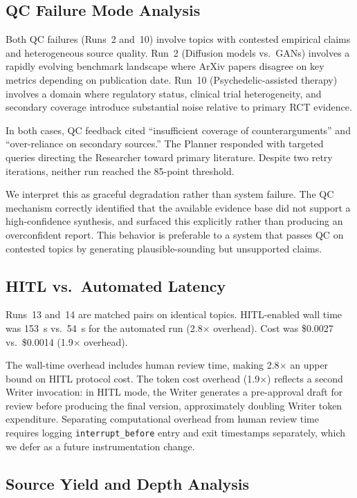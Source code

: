 \documentclass[11pt]{article}
\begin{document}
\subsection{QC Failure Mode Analysis}

Both QC failures (Runs~2 and~10) involve topics with contested empirical claims
and heterogeneous source quality. Run~2 (Diffusion models vs.\ GANs) involves a
rapidly evolving benchmark landscape where ArXiv papers disagree on key metrics
depending on publication date. Run~10 (Psychedelic-assisted therapy) involves a
domain where regulatory status, clinical trial heterogeneity, and secondary
coverage introduce substantial noise relative to primary RCT evidence.

In both cases, QC feedback cited ``insufficient coverage of counterarguments''
and ``over-reliance on secondary sources.'' The Planner responded with targeted
queries directing the Researcher toward primary literature. Despite two retry
iterations, neither run reached the 85-point threshold.

We interpret this as graceful degradation rather than system failure. The QC
mechanism correctly identified that the available evidence base did not support a
high-confidence synthesis, and surfaced this explicitly rather than producing an
overconfident report. This behavior is preferable to a system that passes QC on
contested topics by generating plausible-sounding but unsupported claims.

\subsection{HITL vs.\ Automated Latency}

Runs~13 and~14 are matched pairs on identical topics. HITL-enabled wall time was
153~s vs.\ 54~s for the automated run (2.8$\times$ overhead). Cost was \$0.0027
vs.\ \$0.0014 (1.9$\times$ overhead).

The wall-time overhead includes human review time, making 2.8$\times$ an upper
bound on HITL protocol cost. The token cost overhead (1.9$\times$) reflects a
second Writer invocation: in HITL mode, the Writer generates a pre-approval
draft for review before producing the final version, approximately doubling
Writer token expenditure. Separating computational overhead from human review
time requires logging \texttt{interrupt\_before} entry and exit timestamps
separately, which we defer as a future instrumentation change.

\subsection{Source Yield and Depth Analysis}
\end{document}
